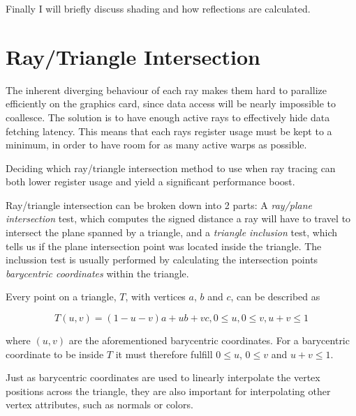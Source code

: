 Finally I will briefly discuss shading and how reflections are
calculated.

\section{Ray/Triangle Intersection}


The inherent diverging behaviour of each ray makes them hard to
parallize efficiently on the graphics card, since data access will be
nearly impossible to coallesce. The solution is to have enough active
rays to effectively hide data fetching latency. This means that each
rays register usage must be kept to a minimum, in order to have room
for as many active warps as possible.

Deciding which ray/triangle intersection method to use when ray
tracing can both lower register usage and yield a significant
performance boost.


Ray/triangle intersection can be broken down into 2 parts: A
\textit{ray/plane intersection} test, which computes the signed
distance a ray will have to travel to intersect the plane spanned by a
triangle, and a \textit{triangle inclusion} test, which tells us if
the plane intersection point was located inside the triangle. The
inclussion test is usually performed by calculating the
intersection points \textit{barycentric coordinates} within the
triangle.

Every point on a triangle, $T$, with vertices $a$, $b$ and $c$, can be
described as

\begin{displaymath}
  T(u,v) = (1-u-v)a + ub + vc, 0 \le u, 0 \le v, u+v \le 1
\end{displaymath}
 
where $(u, v)$ are the aforementioned barycentric coordinates. For a
barycentric coordinate to be inside $T$ it must therefore fulfill $0
\le u$, $0 \le v$ and $u+v \le 1$.

Just as barycentric coordinates are used to linearly interpolate the
vertex positions across the triangle, they are also important for
interpolating other vertex attributes, such as normals or colors.

